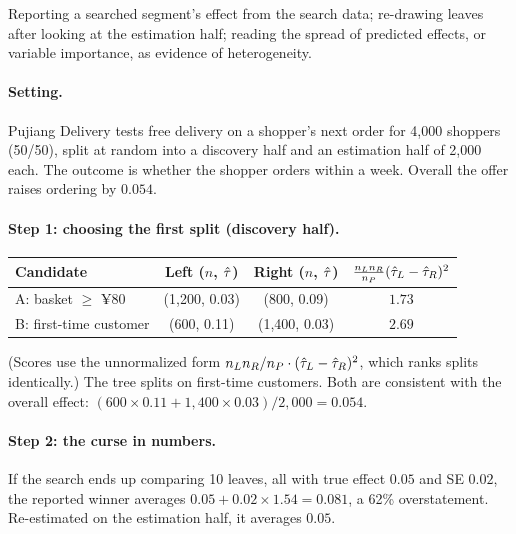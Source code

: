 \documentclass[11pt]{article}
\begin{document}
\begin{pitfall}
Reporting a searched segment's effect from the search data; re-drawing leaves after looking at the estimation
half; reading the spread of predicted effects, or variable importance, as evidence of heterogeneity.
\end{pitfall}


\sectiontwo

\paragraph{Setting.} Pujiang Delivery tests free delivery on a shopper's next order for 4{,}000 shoppers (50/50), split at random into a discovery half and an estimation half of 2{,}000 each. The
outcome is whether the shopper orders within a week. Overall the offer raises ordering by $0.054$.

\paragraph{Step 1: choosing the first split (discovery half).}
\begin{center}
\begin{tabular}{lccc}
\toprule
Candidate & Left ($n$, $\hat{\tau}$) & Right ($n$, $\hat{\tau}$) & $\tfrac{n_Ln_R}{n_P}(\hat{\tau}_L - \hat{\tau}_R)^2$ \\
\midrule
A: basket $\ge$ ¥80 & (1{,}200, 0.03) & (800, 0.09) & $1.73$ \\
B: first-time customer & (600, 0.11) & (1{,}400, 0.03) & $2.69$ \\
\bottomrule
\end{tabular}
\end{center}
(Scores use the unnormalized form $n_Ln_R/n_P \cdot (\hat{\tau}_L - \hat{\tau}_R)^2$, which ranks splits identically.) The tree
splits on first-time customers. Both are consistent with the overall effect: $(600 \times 0.11 + 1{,}400 \times 0.03)/2{,}000 = 0.054$.

\paragraph{Step 2: the curse in numbers.} If the search ends up comparing 10 leaves, all with true effect $0.05$
and SE $0.02$, the reported winner averages $0.05 + 0.02 \times 1.54 = 0.081$, a 62\% overstatement. Re-estimated on
the estimation half, it averages $0.05$.
\end{document}
